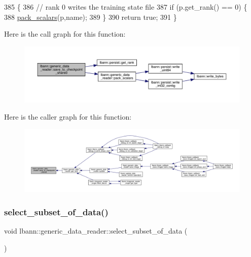 \begin{DoxyCode}
385                                                                                 \{
386   \textcolor{comment}{// rank 0 writes the training state file}
387   \textcolor{keywordflow}{if} (p.get\_rank() == 0) \{
388     \hyperlink{classlbann_1_1generic__data__reader_a93dddd2276ddc34cc97922ee27c44582}{pack\_scalars}(p,name);
389   \}
390   \textcolor{keywordflow}{return} \textcolor{keyword}{true};
391 \}
\end{DoxyCode}
Here is the call graph for this function\+:\nopagebreak
\begin{figure}[H]
\begin{center}
\leavevmode
\includegraphics[width=350pt]{classlbann_1_1generic__data__reader_a6f49d945610f35335fce4a422a432cc1_cgraph}
\end{center}
\end{figure}
Here is the caller graph for this function\+:\nopagebreak
\begin{figure}[H]
\begin{center}
\leavevmode
\includegraphics[width=350pt]{classlbann_1_1generic__data__reader_a6f49d945610f35335fce4a422a432cc1_icgraph}
\end{center}
\end{figure}
\mbox{\label{classlbann_1_1generic__data__reader_aa28fdeeb6af492540f507e49adff5d6c}} 
\subsubsection{\texorpdfstring{select\+\_\+subset\+\_\+of\+\_\+data()}{select\_subset\_of\_data()}}
{\footnotesize\ttfamily void lbann\+::generic\+\_\+data\+\_\+reader\+::select\+\_\+subset\+\_\+of\+\_\+data (\begin{DoxyParamCaption}{ }\end{DoxyParamCaption})}

